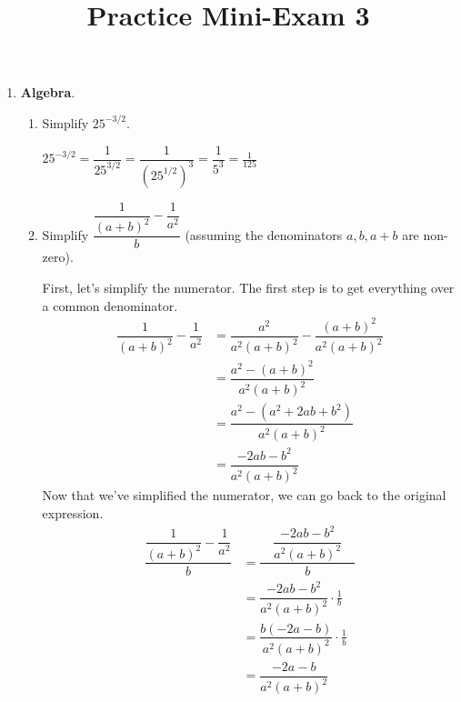 \documentclass{article}
\theoremstyle{theorem}
\begin{document}
  \title{Practice Mini-Exam 3}


\listofproblems

\begin{enumerate}
\item {} \textbf{Algebra}.

  \begin{enumerate}
  \item 
    \begin{problem}[1in]
      Simplify $25^{-3/2}$. 
    \end{problem}

    \begin{solution}
      $25^{-3/2} = \dfrac{1}{25^{3/2}} = \dfrac{1}{(25^{1/2})^3} = \dfrac{1}{5^3} = \boxed{\frac{1}{125}}$ 
    \end{solution}

  \item 
    \begin{problem}[\stretch{1.5}]
      Simplify $\dfrac{\dfrac{1}{(a + b)^2} - \dfrac{1}{a^2}}{b}$ (assuming the denominators $a, b, a + b$ are non-zero).
    \end{problem}

    \begin{solution}
      First, let's simplify the numerator. The first step is to get everything over a common denominator. 
      \begin{align*}
        \dfrac{1}{(a + b)^2} - \dfrac{1}{a^2} &= \dfrac{a^2}{ a^2 (a + b)^2} - \dfrac{(a + b)^2}{a^2 (a + b)^2} \\
        &= \dfrac{a^2 - (a + b)^2}{a^2 (a + b)^2} \\
        &= \dfrac{a^2 - (a^2 + 2ab + b^2)}{a^2 (a + b)^2} \\
        &= \dfrac{-2ab-b^2}{a^2 (a + b)^2}         
      \end{align*}
      Now that we've simplified the numerator, we can go back to the original expression. 
      \begin{align*}
        \dfrac{\dfrac{1}{(a + b)^2} - \dfrac{1}{a^2}}{b} &= \dfrac{\quad \dfrac{-2ab-b^2}{a^2 (a + b)^2}\quad}{b} \\
        &= \dfrac{-2ab-b^2}{a^2 (a + b)^2} \cdot \frac{1}{b} \\
        &= \dfrac{b (-2a-b)}{a^2 (a + b)^2} \cdot \frac{1}{b} \\
        &= \boxed{\dfrac{-2a-b}{a^2 (a + b)^2}}
      \end{align*}
    \end{solution}


\end{enumerate}
\end{enumerate}
\end{document}
